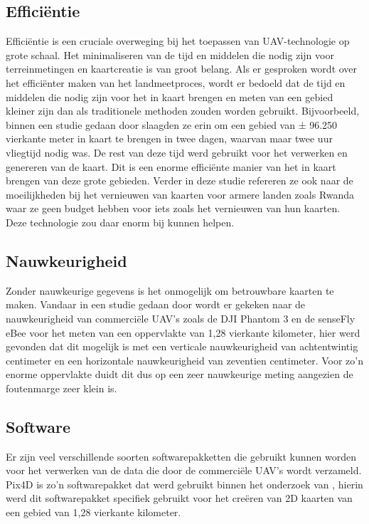 \documentclass{hogent-article}
\begin{document}
\subsection{Efficiëntie}
\label{sec:efficientie}
Efficiëntie is een cruciale overweging bij het toepassen van UAV-technologie op grote schaal.
Het minimaliseren van de tijd en middelen die nodig zijn voor terreinmetingen en kaartcreatie is van groot belang.
Als er gesproken wordt over het efficiënter maken van het landmeetproces, wordt er bedoeld dat de tijd en middelen die nodig zijn voor het in kaart brengen en meten van een gebied kleiner zijn dan als traditionele methoden zouden worden gebruikt.
Bijvoorbeeld, binnen een studie gedaan door \textcite{Koeva2016} slaagden ze erin om een gebied van ± 96.250 vierkante meter in kaart te brengen in twee dagen, waarvan maar twee uur vliegtijd nodig was.
De rest van deze tijd werd gebruikt voor het verwerken en genereren van de kaart. Dit is een enorme efficiënte manier van het in kaart brengen van deze grote gebieden. Verder in deze studie refereren ze ook naar de moeilijkheden bij het vernieuwen van kaarten voor armere landen zoals Rwanda waar ze geen budget hebben voor iets zoals het vernieuwen van hun kaarten.
Deze technologie zou daar enorm bij kunnen helpen.

\subsection{Nauwkeurigheid}
\label{sec:nauwkeurigheid}
Zonder nauwkeurige gegevens is het onmogelijk om betrouwbare kaarten te maken. Vandaar in een studie gedaan door \textcite{madawalagama2016low} wordt er gekeken naar de nauwkeurigheid van commerciële UAV's zoals de DJI Phantom 3\textsuperscript{\textregistered} en de senseFly eBee\textsuperscript{\textregistered} voor het meten van een oppervlakte van 1,28 vierkante kilometer, hier werd gevonden dat dit mogelijk is met een verticale nauwkeurigheid van achtentwintig centimeter en een horizontale nauwkeurigheid van zeventien centimeter.
Voor zo'n enorme oppervlakte duidt dit dus op een zeer nauwkeurige meting aangezien de foutenmarge zeer klein is.

\subsection{Software}
\label{sec:software}
Er zijn veel verschillende soorten softwarepakketten die gebruikt kunnen worden voor het verwerken van de data die door de commerciële UAV's wordt verzameld. Pix4D\textsuperscript{\textregistered} is zo'n softwarepakket dat werd gebruikt binnen het onderzoek van \textcite{madawalagama2016low}, hierin werd dit softwarepakket specifiek gebruikt voor het creëren van 2D kaarten van een gebied van 1,28 vierkante kilometer.
\end{document}
